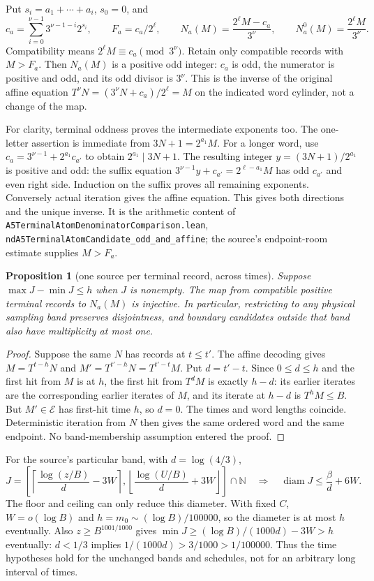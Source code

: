 \documentclass[11pt]{article}
\newtheorem{proposition}{Proposition}
\theoremstyle{remark}\newtheorem{remark}[proposition]{Remark}
\begin{document}
Put $s_i=a_1+\cdots+a_i$, $s_0=0$, and
\[
 c_a=\sum_{i=0}^{\nu-1}3^{\nu-1-i}2^{s_i},\qquad
 F_a=c_a/2^\ell,\qquad
 N_a(M)=\frac{2^\ell M-c_a}{3^\nu},\qquad
 N_a^0(M)=\frac{2^\ell M}{3^\nu}.
\]
Compatibility means $2^\ell M\equiv c_a\pmod{3^\nu}$.
Retain only compatible records with $M>F_a$. Then $N_a(M)$ is a
positive odd integer: $c_a$ is odd, the numerator is positive and
odd, and its odd divisor is $3^\nu$.
This is the inverse of the original affine equation
$T^\nu N=(3^\nu N+c_a)/2^\ell=M$ on the indicated word cylinder,
not a change of the map.

For clarity, terminal oddness proves the intermediate exponents too.
The one-letter assertion is immediate from $3N+1=2^{a_1}M$.
For a longer word, use $c_a=3^{\nu-1}+2^{a_1}c_{a'}$ to obtain
$2^{a_1}\mid3N+1$. The resulting integer $y=(3N+1)/2^{a_1}$
is positive and odd: the suffix equation
$3^{\nu-1}y+c_{a'}=2^{\ell-a_1}M$ has odd $c_{a'}$ and even
right side. Induction on the suffix proves all remaining exponents.
Conversely actual iteration gives the affine equation.
This gives both directions and the unique inverse.
It is the arithmetic content of
\texttt{A5TerminalAtomDenominatorComparison.lean},
\texttt{ndA5TerminalAtomCandidate\_odd\_and\_affine};
the source's endpoint-room estimate supplies $M>F_a$.

\begin{proposition}[one source per terminal record, across times]
\label{prop:mazur-atoms}
Suppose $\max J-\min J\le h$ when $J$ is nonempty.
The map from compatible positive terminal records to $N_a(M)$ is
injective. In particular, restricting to any physical sampling band
preserves disjointness, and boundary candidates outside that band
also have multiplicity at most one.
\end{proposition}
\begin{proof}
Suppose the same $N$ has records at $t\le t'$.
The affine decoding gives $M=T^{t-h}N$ and
$M'=T^{t'-h}N=T^{t'-t}M$. Put $d=t'-t$.
Since $0\le d\le h$ and the first hit from $M$ is at $h$,
the first hit from $T^dM$ is exactly $h-d$:
its earlier iterates are the corresponding earlier iterates of $M$,
and its iterate at $h-d$ is $T^hM\le B$.
But $M'\in\mathcal E$ has first-hit time $h$, so $d=0$.
The times and word lengths coincide. Deterministic iteration from $N$
then gives the same ordered word and the same endpoint.
No band-membership assumption entered the proof.
\end{proof}

For the source's particular band, with $d=\log(4/3)$,
\[
 J=\left[\left\lceil\frac{\log(z/B)}d-3W\right\rceil,
          \left\lfloor\frac{\log(U/B)}d+3W\right\rfloor\right]
          \cap\mathbb N
 \quad\Longrightarrow\quad
 \operatorname{diam}J\le\frac{\beta}{d}+6W .
\]
The floor and ceiling can only reduce this diameter.
With fixed $C$, $W=o(\log B)$ and
$h=m_0\sim(\log B)/100000$, so the diameter is at most $h$
eventually. Also $z\ge B^{1001/1000}$ gives
$\min J\ge (\log B)/(1000d)-3W>h$ eventually:
$d<1/3$ implies $1/(1000d)>3/1000>1/100000$.
Thus the time hypotheses hold for the unchanged bands and schedules,
not for an arbitrary long interval of times.
\end{document}
